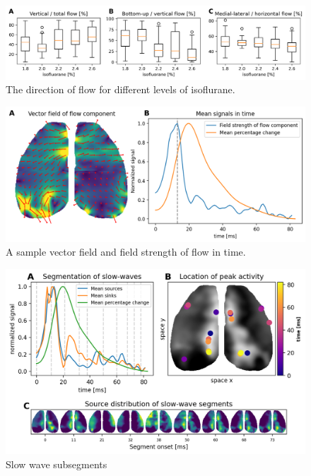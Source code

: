 \begin{figure}[!htb]
\centering
\includegraphics[width=\textwidth,height=\textheight,keepaspectratio]{Figures/direction_per_isoflourane}
\decoRule
\caption[Direction of flow for different levels of isoflurane]{The direction of flow for different levels of isoflurane.}
\label{fig:direction_per_isoflourane}
\end{figure}

\begin{figure}[!htb]
\centering
\includegraphics[width=\textwidth,height=\textheight,keepaspectratio]{Figures/vector_field_flow_component}
\decoRule
\caption[A sample vector field and field strength of flow in time.]{A sample vector field and field strength of flow in time.}
\label{fig:vector_field_flow_component}
\end{figure}

\begin{figure}[!htb]
\centering
\includegraphics[width=\textwidth,height=\textheight,keepaspectratio]{Figures/slow_wave_subsegements}
\decoRule
\caption[Slow wave subsegments]{Slow wave subsegments}
\label{fig:slow_wave_subsegements}
\end{figure}

